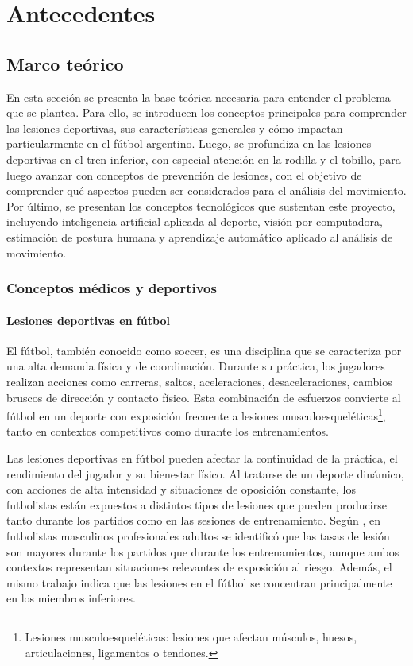 \chapter{Antecedentes}\label{antecedentes}

\section{Marco teórico}

En esta sección se presenta la base teórica necesaria para entender el problema que se plantea. 
Para ello, se introducen los conceptos principales para comprender las lesiones deportivas, 
sus características generales y cómo impactan particularmente en el fútbol argentino. 
Luego, se profundiza en las lesiones deportivas en el tren inferior, con especial atención en la rodilla y 
el tobillo, para luego avanzar con conceptos de prevención de lesiones, con el objetivo de comprender qué 
aspectos pueden ser considerados para el análisis del movimiento. Por último, se presentan los conceptos 
tecnológicos que sustentan este proyecto, incluyendo inteligencia artificial aplicada al deporte, 
visión por computadora, estimación de postura humana y aprendizaje automático aplicado al análisis de movimiento.

\subsection{Conceptos médicos y deportivos}

\subsubsection{Lesiones deportivas en fútbol}

El fútbol, también conocido como soccer, es una disciplina que se caracteriza por una alta demanda física y de coordinación.
Durante su práctica, los jugadores realizan acciones como carreras, saltos, aceleraciones, desaceleraciones, cambios bruscos de dirección y contacto físico. 
Esta combinación de esfuerzos convierte al fútbol en un deporte con exposición frecuente a lesiones musculoesqueléticas\footnote{Lesiones musculoesqueléticas: lesiones que afectan músculos, huesos, articulaciones, ligamentos o tendones.}, 
tanto en contextos competitivos como durante los entrenamientos.

Las lesiones deportivas en fútbol pueden afectar la continuidad de la práctica, el rendimiento del jugador y su bienestar físico.
Al tratarse de un deporte dinámico, con acciones de alta intensidad y situaciones de oposición constante, los futbolistas están 
expuestos a distintos tipos de lesiones que pueden producirse tanto durante los partidos como en las sesiones de entrenamiento. 
Según \textcite{PfirrmannEtAl2016}, en futbolistas masculinos profesionales adultos se identificó que las tasas de lesión 
son mayores durante los partidos que durante los entrenamientos, aunque ambos contextos representan situaciones relevantes 
de exposición al riesgo. Además, el mismo trabajo indica que las lesiones en el fútbol se concentran principalmente en los miembros inferiores.

